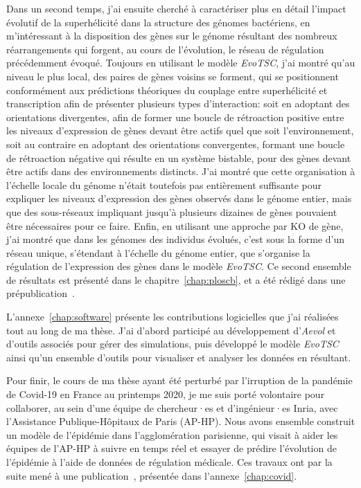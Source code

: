 
Dans un second temps, j'ai ensuite cherché à caractériser plus en détail l'impact évolutif de la superhélicité dans la structure des génomes bactériens, en m'intéressant à la disposition des gènes sur le génome résultant des nombreux réarrangements qui forgent, au cours de l'évolution, le réseau de régulation précédemment évoqué.
Toujours en utilisant le modèle \emph{EvoTSC}, j'ai montré qu'au niveau le plus local, des paires de gènes voisins se forment, qui se positionnent conformément aux prédictions théoriques du couplage entre superhélicité et transcription afin de présenter plusieurs types d'interaction: soit en adoptant des orientations divergentes, afin de former une boucle de rétroaction positive entre les niveaux d'expression de gènes devant être actifs quel que soit l'environnement, soit au contraire en adoptant des orientations convergentes, formant une boucle de rétroaction négative qui résulte en un système bistable, pour des gènes devant être actifs dans des environnements distincts.
J'ai montré que cette organisation à l'échelle locale du génome n'était toutefois pas entièrement suffisante pour expliquer les niveaux d'expression des gènes observés dans le génome entier, mais que des sous-réseaux impliquant jusqu'à plusieurs dizaines de gènes pouvaient être nécessaires pour ce faire.
Enfin, en utilisant une approche par KO de gène, j'ai montré que dans les génomes des individus évolués, c'est sous la forme d'un réseau unique, s'étendant à l'échelle du génome entier, que s'organise la régulation de l'expression des gènes dans le modèle \emph{EvoTSC}.
Ce second ensemble de résultats est présenté dans le chapitre~\ref{chap:ploscb}, et a été rédigé dans une prépublication~\citep{grohens2022b}.


L'annexe~\ref{chap:software} présente les contributions logicielles que j'ai réalisées tout au long de ma thèse.
J'ai d'abord participé au développement d'\emph{Aevol} et d'outils associés pour gérer des simulations, puis développé le modèle \emph{EvoTSC} ainsi qu'un ensemble d'outils pour visualiser et analyser les données en résultant.

Pour finir, le cours de ma thèse ayant été perturbé par l'irruption de la pandémie de Covid-19 en France au printemps 2020, je me suis porté volontaire pour collaborer, au sein d'une équipe de chercheur·es et d'ingénieur·es Inria, avec l'Assistance Publique-Hôpitaux de Paris (AP-HP).
Nous avons ensemble construit un modèle de l'épidémie dans l'agglomération parisienne, qui visait à aider les équipes de l'AP-HP à suivre en temps réel et essayer de prédire l'évolution de l'épidémie à l'aide de données de régulation médicale.
Ces travaux ont par la suite mené à une publication~\citep{gaubert2020}, présentée dans l'annexe~\ref{chap:covid}.

